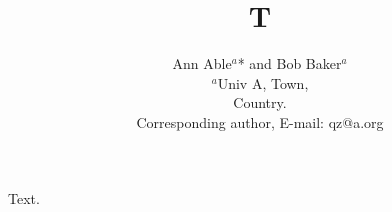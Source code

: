 \documentclass{article}
\title{T}
\author{Ann Able$^{a}$* and Bob Baker$^{a}$\\
{\small $^{a}$Univ A, Town,}\\
{\small Country.}\\
{\small * Corresponding author, E-mail: qz@a.org }}
\date{}
\begin{document}
\maketitle
Text.
\end{document}
